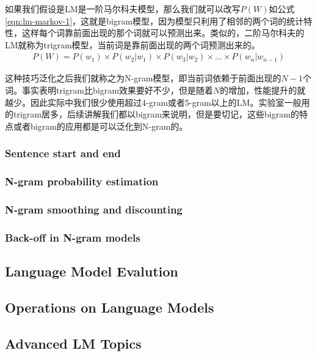 如果我们假设是LM是一阶马尔科夫模型，那么我们就可以改写$P(W)$如公式\ref{eqn:lm-markov-1}，这就是bigram模型，因为模型只利用了相邻的两个词的统计特性，这样每个词靠前面出现的那个词就可以预测出来。类似的，二阶马尔科夫的LM就称为trigram模型，当前词是靠前面出现的两个词预测出来的。
\begin{align}
\label{eqn:lm-markov-1}
P(W) = P(w_1)\times{P(w_2|w_1)}\times{P(w_3|w_{2})}\times...\times{P(w_n|w_{n-1})} 
\end{align}

这种技巧泛化之后我们就称之为N-gram模型，即当前词依赖于前面出现的$N-1$个词。事实表明trigram比bigram效果要好不少，但是随着$N$的增加，性能提升的就越少。因此实际中我们很少使用超过4-gram或者5-gram以上的LM。实验室一般用的trigram居多，后续讲解我们都以bigram来说明，但是要切记，这些bigram的特点或者bigram的应用都是可以泛化到N-gram的。

\subsubsection{Sentence start and end}



\subsubsection{N-gram probability estimation}

\subsubsection{N-gram smoothing and discounting}

\subsubsection{Back-off in N-gram models}

\subsection{Language Model Evalution}

\subsection{Operations on Language Models}

\subsection{Advanced LM Topics}


